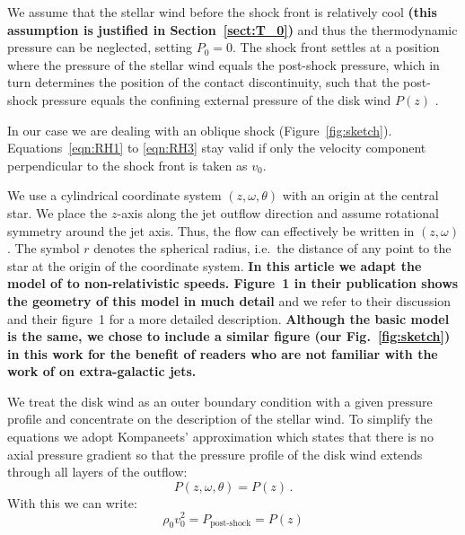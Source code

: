 \documentclass[manuscript]{aastex}
\begin{document}
We assume that the stellar wind before the shock front is relatively cool \textbf{(this assumption is justified in Section~\ref{sect:T_0})} and thus the thermodynamic pressure can be neglected, setting $P_0=0$.
The shock front settles at a position where the pressure of the stellar wind equals the post-shock pressure, which in turn determines the position of the contact discontinuity, such that the post-shock pressure equals the confining external pressure of the disk wind $P(z)$ . 

In our case we are dealing with an oblique shock (Figure~\ref{fig:sketch}). Equations~\ref{eqn:RH1} to \ref{eqn:RH3} stay valid if only the velocity component perpendicular to the shock front is taken as $v_0$. 

We use a cylindrical coordinate system $(z, \omega, \theta)$ with an origin at the central star. We place the $z$-axis along the jet outflow direction and assume rotational symmetry around the jet axis. Thus, the flow can effectively be written in $(z,\omega)$. The symbol $r$ denotes the spherical radius, i.e.\ the distance of any point to the star at the origin of the coordinate system. 
\textbf{In this article we adapt the model of 
\citet{2012MNRAS.422.2282K} to non-relativistic speeds. Figure~1 in their publication shows the geometry of this model in much detail} and we refer to their discussion and their figure~1 for a more detailed description. \textbf{Although the basic model is the same, we chose to include a similar figure (our Fig.~\ref{fig:sketch}) in this work for the benefit of readers who are not familiar with the work of \citet{2012MNRAS.422.2282K} on extra-galactic jets.} 

We treat the disk wind as an outer boundary condition with a given pressure profile and concentrate on the description of the stellar wind. To simplify the equations we adopt Kompaneets' approximation \citep{1960SPhD....5...46K} which states that there is no axial pressure gradient so that the pressure profile of the disk wind extends through all layers of the outflow:
\begin{equation}
P(z, \omega, \theta) = P(z)\,.
\end{equation}
With this we can write:
\begin{equation}\label{eqn:Pofz}
\rho_0 v_0^2 = P_{\textrm{post-shock}} = P(z)
\end{equation}
\end{document}
